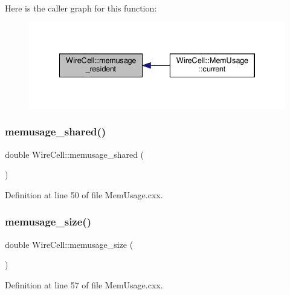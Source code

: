 Here is the caller graph for this function\+:
\nopagebreak
\begin{figure}[H]
\begin{center}
\leavevmode
\includegraphics[width=334pt]{namespace_wire_cell_ab9a89ef526d9db272e072e95556f6a3b_icgraph}
\end{center}
\end{figure}
\mbox{\label{namespace_wire_cell_a4d80e4c561949f1572382e432cfb4f22}} 
\subsubsection{\texorpdfstring{memusage\+\_\+shared()}{memusage\_shared()}}
{\footnotesize\ttfamily double Wire\+Cell\+::memusage\+\_\+shared (\begin{DoxyParamCaption}{ }\end{DoxyParamCaption})}



Definition at line 50 of file Mem\+Usage.\+cxx.

\mbox{\label{namespace_wire_cell_a079570140982516787676ec882e0f297}} 
\subsubsection{\texorpdfstring{memusage\+\_\+size()}{memusage\_size()}}
{\footnotesize\ttfamily double Wire\+Cell\+::memusage\+\_\+size (\begin{DoxyParamCaption}{ }\end{DoxyParamCaption})}



Definition at line 57 of file Mem\+Usage.\+cxx.

